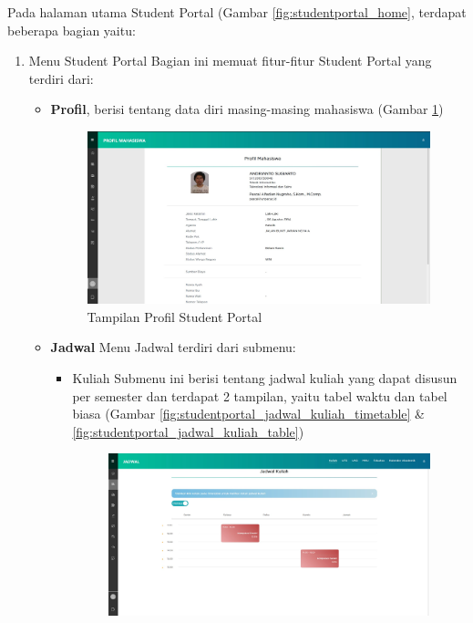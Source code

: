 Pada halaman utama Student Portal (Gambar \ref{fig:studentportal_home}, terdapat beberapa bagian yaitu:
\begin{enumerate}
	\item Menu Student Portal
	Bagian ini memuat fitur-fitur Student Portal yang terdiri dari:
	\begin{itemize}
		\item \textbf{Profil}, berisi tentang data diri masing-masing mahasiswa (Gambar \ref{fig:studentportal_profil})
		\begin{figure}[H]
		\centering
		\includegraphics[scale=0.3]{Gambar/studentportal_profil}
		\caption{Tampilan Profil Student Portal}
		\label{fig:studentportal_profil}
		\end{figure}
		\item \textbf{Jadwal}
		Menu Jadwal terdiri dari submenu:
		\begin{itemize}
			\item Kuliah
			Submenu ini berisi tentang jadwal kuliah yang dapat disusun per semester dan terdapat 2 tampilan, yaitu tabel waktu dan tabel biasa (Gambar \ref{fig:studentportal_jadwal_kuliah_timetable} \& \ref{fig:studentportal_jadwal_kuliah_table})
			\begin{figure}[H]
			\centering
			\includegraphics[scale=0.3]{Gambar/studentportal_jadwal_kuliah}

\end{figure}
\end{itemize}
\end{itemize}
\end{enumerate}

